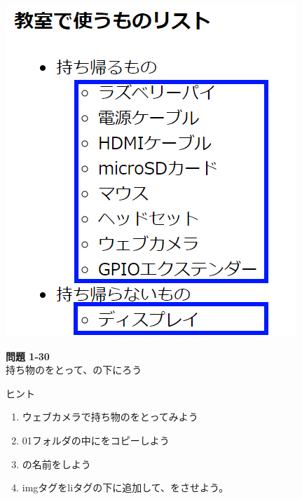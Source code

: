 \begin{minipage}{0.45\linewidth}
  \includegraphics[width=\linewidth]{text01-img/textbook-img1044.png}
\end{minipage}

\bigskip
\flushleft

\noindent \textbf{問題 1-30}\\
持ち物のをとって、の下にろう

ヒント

\begin{enumerate}
  \item
        ウェブカメラで持ち物のをとってみよう
  \item
        01フォルダの中にをコピーしよう
  \item {}の名前をしよう
  \item
        imgタグをliタグの下に追加して、をさせよう。
\end{enumerate}

\bigskip


\clearpage
